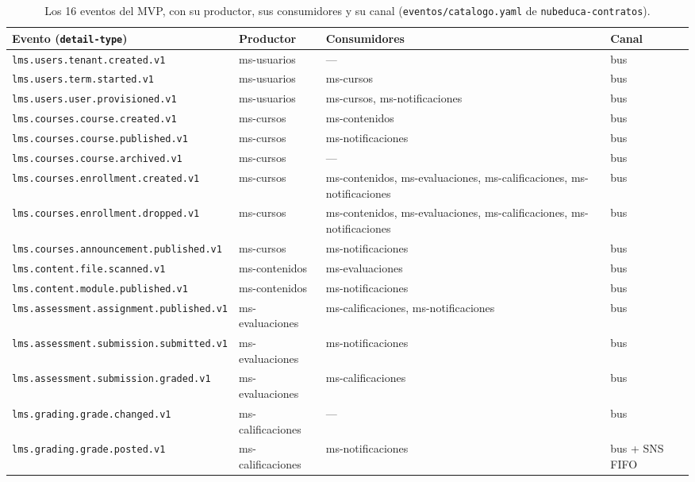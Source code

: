 \begin{table}[htbp]
\centering\footnotesize
\begin{tabularx}{\textwidth}{l l >{\raggedright\arraybackslash}X l}
\toprule
Evento (\texttt{detail-type}) & Productor & Consumidores & Canal \\
\midrule
\texttt{lms.users.tenant.created.v1} & ms-usuarios & --- & bus \\
\texttt{lms.users.term.started.v1} & ms-usuarios & ms-cursos & bus \\
\texttt{lms.users.user.provisioned.v1} & ms-usuarios & ms-cursos, ms-notificaciones & bus \\
\midrule
\texttt{lms.courses.course.created.v1} & ms-cursos & ms-contenidos & bus \\
\texttt{lms.courses.course.published.v1} & ms-cursos & ms-notificaciones & bus \\
\texttt{lms.courses.course.archived.v1} & ms-cursos & --- & bus \\
\texttt{lms.courses.enrollment.created.v1} & ms-cursos & ms-contenidos, ms-evaluaciones, ms-calificaciones, ms-notificaciones & bus \\
\texttt{lms.courses.enrollment.dropped.v1} & ms-cursos & ms-contenidos, ms-evaluaciones, ms-calificaciones, ms-notificaciones & bus \\
\texttt{lms.courses.announcement.published.v1} & ms-cursos & ms-notificaciones & bus \\
\midrule
\texttt{lms.content.file.scanned.v1} & ms-contenidos & ms-evaluaciones & bus \\
\texttt{lms.content.module.published.v1} & ms-contenidos & ms-notificaciones & bus \\
\midrule
\texttt{lms.assessment.assignment.published.v1} & ms-evaluaciones & ms-calificaciones, ms-notificaciones & bus \\
\texttt{lms.assessment.submission.submitted.v1} & ms-evaluaciones & ms-notificaciones & bus \\
\texttt{lms.assessment.submission.graded.v1} & ms-evaluaciones & ms-calificaciones & bus \\
\midrule
\texttt{lms.grading.grade.changed.v1} & ms-calificaciones & --- & bus \\
\texttt{lms.grading.grade.posted.v1} & ms-calificaciones & ms-notificaciones & bus + SNS FIFO \\
\bottomrule
\end{tabularx}
\caption{Los 16 eventos del MVP, con su productor, sus consumidores y su canal
(\texttt{eventos/catalogo.yaml} de \texttt{nubeduca-contratos}).}
\label{tab:eventos}
\end{table}

